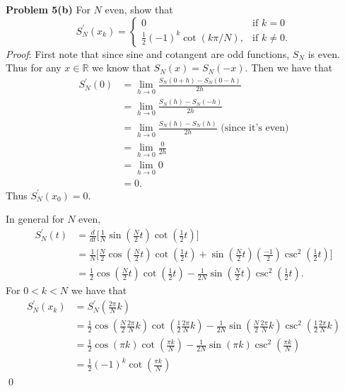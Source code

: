\documentclass[12pt]{article}
\newcommand{\problem}[1]{\hspace{-4 ex} \large \textbf{Problem #1} }
\renewenvironment{proof}{\hspace{-4 ex} \emph{Proof}:}{\qed}
\newcommand{\RR}{\mathbb{R}}
\begin{document}
\problem{5(b)} For $N$ even, show that 
$$
S_N^\prime(x_k) = \begin{cases} 0 & \text{if } k=0 \\
							\frac{1}{2}(-1)^k\cot(k\pi / N), & \text{if } k \neq 0 \text{.} \end{cases}
$$
\begin{proof}
	First note that since sine and cotangent are odd functions, $S_N$ is even. Thus for any $x \in \RR$ we know that $S_N(x) = S_N(-x)$. Then we have that
	\begin{align*}
		S_N^\prime(0) &= \lim_{h \to 0} \frac{S_N(0+h) - S_N(0-h)}{2h} \\
			&= \lim_{h \to 0} \frac{S_N(h) - S_N(-h)}{2h} \\
			&= \lim_{h \to 0} \frac{S_N(h) - S_N(h)}{2h} \text{\ \ \ \ (since it's even)}\\
			&= \lim_{h \to 0} \frac{0}{2h} \\
			&= \lim_{h \to 0} 0 \\
			&= 0 \text{.}
	\end{align*}
	Thus $S_N^\prime(x_0) = 0$.\bigbreak
	
	In general for $N$ even,
	\begin{align*}
		S_N^\prime(t) &= \frac{d}{dt} \bigg[\frac{1}{N} \sin \left(\frac{N}{2}t \right) \cot \left( \frac{1}{2}t \right) \bigg] \\
		&= \frac{1}{N} \bigg[ \frac{N}{2}\cos\left(\frac{N}{2}t \right)\cot \left( \frac{1}{2}t \right) + 
			\sin \left(\frac{N}{2}t \right) \left(\tfrac{-1}{2} \right) \csc^2\left( \frac{1}{2}t \right) \bigg] \\
		&= \frac{1}{2}\cos\left(\frac{N}{2}t \right)\cot \left( \frac{1}{2}t \right) - 
		\frac{1}{2N}\sin \left(\frac{N}{2}t \right)  \csc^2 \left( \frac{1}{2}t \right) \text{.}
	\end{align*}
	For $0 < k < N$ we have that
	\begin{align*}
		S_N^\prime(x_k) &= S_N^\prime\left(\frac{2\pi}{N}k \right) \\
		&= \frac{1}{2}\cos\left(\frac{N}{2}\frac{2\pi}{N}k \right)\cot \left( \frac{1}{2}\frac{2\pi}{N}k \right) - 
		\frac{1}{2N}\sin \left(\frac{N}{2}\frac{2\pi}{N}k \right)  \csc^2 \left( \frac{1}{2}\frac{2\pi}{N}k \right) \\
		&= \frac{1}{2}\cos(\pi k )\cot \left( \frac{\pi k}{N} \right) - 
		\frac{1}{2N}\sin(\pi k )  \csc^2 \left( \frac{\pi k}{N} \right) \\
		&= \frac{1}{2}(-1)^k \cot \left( \frac{\pi k}{N} \right)
	\end{align*}
\end{proof}
\end{document}
